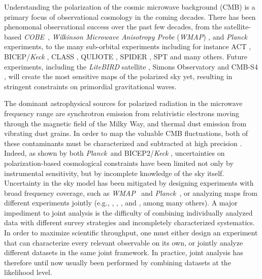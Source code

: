 \documentclass[twocolumn]{../../common/aa}
\def\WMAP{\emph{WMAP}}
\def\COBE{\emph{COBE}}
\def\Planck{\emph{Planck}}
\begin{document}
Understanding the polarization of the cosmic microwave background (CMB) is a primary focus of observational cosmology in the coming decades. There has been phenomonal observational success over the past few decades, from the satellite-based \COBE\ \citep{smoot:1992,mather:1994,hauser:1998}, \textit{Wilkinson Microwave Anisotropy Probe} (\WMAP) \citep{bennett2012}, and \Planck\ \citep{planck2016-l01} experiments, to the many sub-orbital experiments including for instance ACT \citep{actDR6_lensing}, BICEP/\textit{Keck} \citep{bicep2021}, CLASS \citep{eimer2023}, QUIJOTE \citep{QUIJOTE_IV}, SPIDER \citep{spider21}, SPT \citep{carlstrom:2011} and many others. Future experiments, including the \textit{LiteBIRD} satellite \citep{litebird2022},  Simons Observatory \citep{SO2019} and CMB-S4 \citep{cmbs4},  will create the most sensitive maps of the polarized sky yet, resulting in stringent constraints on primordial gravitational waves.

The dominant astrophysical sources for polarized radiation in the microwave frequency range are synchrotron emission from relativistic electrons moving through the magnetic field of the Milky Way, and thermal dust emission from vibrating dust grains. In order to map the valuable CMB fluctuations, both of these contaminants must be characterized and subtracted at high precision \citep{planck2014-a12}. Indeed, as shown by both \Planck\ and BICEP2/\textit{Keck} \citep{planck2016-l02,pb2015}, uncertainties on polarization-based cosmological constraints have been limited not only by instrumental sensitivity, but by incomplete knowledge of the sky itself. Uncertainty in the sky model has been mitigated by designing experiments with broad frequency coverage, such as \WMAP\ \citep{bennett2012} and \Planck\ \citep{planck2016-l01}, or analyzing maps from different experiments jointly (e.g., \citealp{dmr}, \citealp{bennett2012}, \citealp{planck2014-a12}, and \citealp{pb2015}, among many others).
A major impediment to joint analysis is the difficulty of combining individually analyzed data with different survey strategies and incompletely characterized systematics. In order to maximize scientific throughput, one must either design an experiment that can characterize every relevant observable on its own, or jointly analyze different datasets in the same joint framework. In practice, joint analysis has therefore  until now usually been performed by combining datasets at the likelihood level.
\end{document}
